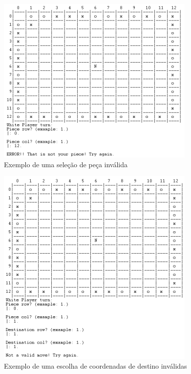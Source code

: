 \documentclass[a4paper]{article}
\begin{document}
\begin{figure}
\begin{center}
\hspace*{-0.5cm}\includegraphics[scale=1]{game2.png}
\caption{Exemplo de uma seleção de peça inválida}
\end{center}
\end{figure}

\begin{figure}
\begin{center}
\hspace*{-0.5cm}\includegraphics[scale=1]{game3.png}
\caption{Exemplo de uma escolha de coordenadas de destino inválidas}
\end{center}
\end{figure}



\newpage
\end{document}
